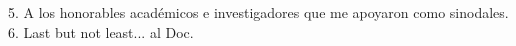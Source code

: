 \documentclass[
12pt, %
spanish, %
singlespacing, %
headsepline, %
]{MastersDoctoralThesis} %
\begin{document}
\begin{acknowledgements}
5. A los honorables académicos e investigadores que me apoyaron como sinodales.\\





6. Last but not least... al Doc.\\


\end{acknowledgements}


\tableofcontents %
\end{document}
